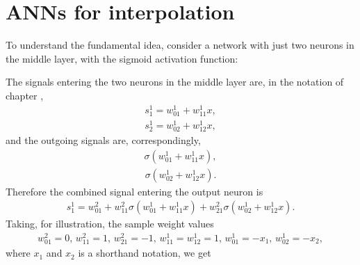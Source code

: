 \documentclass[a4paper,12pt,polish]{jupyterBook}
\begin{document}
\section{ANNs for interpolation}
\label{\detokenize{docs/interpol:anns-for-interpolation}}
\sphinxAtStartPar
To understand the fundamental idea, consider a network with just two neurons in the middle layer, with the sigmoid activation function:
\begin{sphinxVerbatimOutput}

\noindent{}
\end{sphinxVerbatimOutput}

\sphinxAtStartPar
The signals entering the two neurons in the middle layer are, in the notation of chapter {\hyperref[\detokenize{docs/more_layers:more-lab}]{}},
\begin{equation*}
\begin{split}s_1^{1}=w_{01}^{1}+w_{11}^{1} x, \end{split}
\end{equation*}\begin{equation*}
\begin{split}s_2^{1}=w_{02}^{1}+w_{12}^{1} x, \end{split}
\end{equation*}
\sphinxAtStartPar
and the outgoing signals are, correspondingly,
\begin{equation*}
\begin{split}\sigma \left( w_{01}^{1}+w_{11}^{1} x \right), \end{split}
\end{equation*}\begin{equation*}
\begin{split}\sigma \left( w_{02}^{1}+w_{12}^{1} x \right). \end{split}
\end{equation*}
\sphinxAtStartPar
Therefore the combined signal entering the output neuron is
\begin{equation*}
\begin{split}s_1^{1}=w_{01}^{2}+ w_{11}^{2}\sigma \left( w_{01}^{1}+w_{11}^{1} x \right)
+  w_{21}^{2}\sigma \left( w_{02}^{1}+w_{12}^{1} x \right). \end{split}
\end{equation*}
\sphinxAtStartPar
Taking, for illustration, the sample weight values
\begin{equation*}
\begin{split}w_{01}^{2}=0, \, w_{11}^{2}=1, \, w_{21}^{2}=-1, \,
w_{11}^{1}=w_{12}^{1}=1, \, w_{01}^{1}=-x_1,  \, w_{02}^{1}=-x_2, \end{split}
\end{equation*}
\sphinxAtStartPar
where \(x_1\) and \(x_2\) is a short\sphinxhyphen{}hand notation, we get
\end{document}
